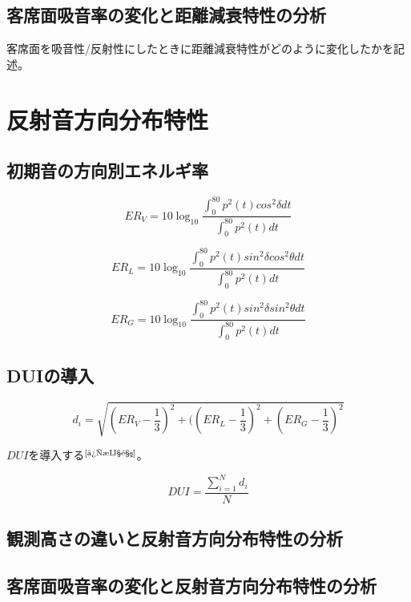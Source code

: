 \subsection{客席面吸音率の変化と距離減衰特性の分析}
客席面を吸音性/反射性にしたときに距離減衰特性がどのように変化したかを記述。
\section{反射音方向分布特性}
\subsection{初期音の方向別エネルギ率}

\begin{equation}
  \label{eq:}
  ER_V = 10\log_{10}{\frac{\displaystyle\int_0^{80}p^2(t)cos^2{\delta}dt}{\displaystyle\int_0^{80}p^2(t)dt}} 
\end{equation}

\begin{equation}
  \label{eq:}
  ER_L = 10\log_{10}{\frac{\displaystyle\int_0^{80}p^2(t)sin^2{\delta}cos^2{\theta}dt}{\displaystyle\int_0^{80}p^2(t)dt}} 
\end{equation}

\begin{equation}
  \label{eq:}
  ER_G = 10\log_{10}{\frac{\displaystyle\int_0^{80}p^2(t)sin^2{\delta}sin^2{\theta}dt}{\displaystyle\int_0^{80}p^2(t)dt}} 
\end{equation}

\subsection{DUIの導入}

\begin{equation}
  \label{eq:}
  d_i = \sqrt{\left({ER_V-\frac{1}{3}}\right)^2 + (\left(ER_L-\frac{1}{3}\right)^2 + \left(ER_G-\frac{1}{3}\right)^2} 
\end{equation}

$DUI$を導入する$^{\text{\cite{後期音}}}$。

\begin{equation}
    \label{eq:}
    DUI=\frac{\sum_{i=1}^N{d_i}}{N}
\end{equation}

\subsection{観測高さの違いと反射音方向分布特性の分析}

\subsection{客席面吸音率の変化と反射音方向分布特性の分析}